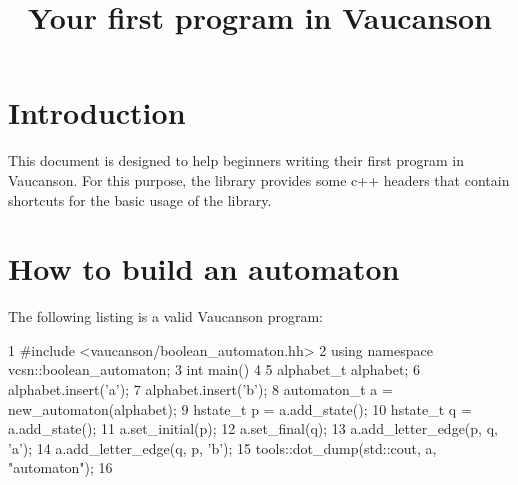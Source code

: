 \documentclass{article}
\begin{document}
\title{Your first program in Vaucanson}

\maketitle
\tableofcontents

\section{Introduction}

This document is designed to help beginners writing their first
program in Vaucanson. For this purpose, the library provides some c++
headers that contain shortcuts for the basic usage of the library.

\section{How to build an automaton}

The following listing is a valid Vaucanson program:

\begin{code}
1  #include <vaucanson/boolean_automaton.hh>
2  using namespace vcsn::boolean_automaton;
3  int main()
4  {
5    alphabet_t alphabet;
6    alphabet.insert('a');
7    alphabet.insert('b');
8    automaton_t a = new_automaton(alphabet);
9    hstate_t p = a.add_state();
10   hstate_t q = a.add_state();
11   a.set_initial(p);
12   a.set_final(q);
13   a.add_letter_edge(p, q, 'a');
14   a.add_letter_edge(q, p, 'b');
15   tools::dot_dump(std::cout, a, "automaton");
16 }
\end{code}
\end{document}
